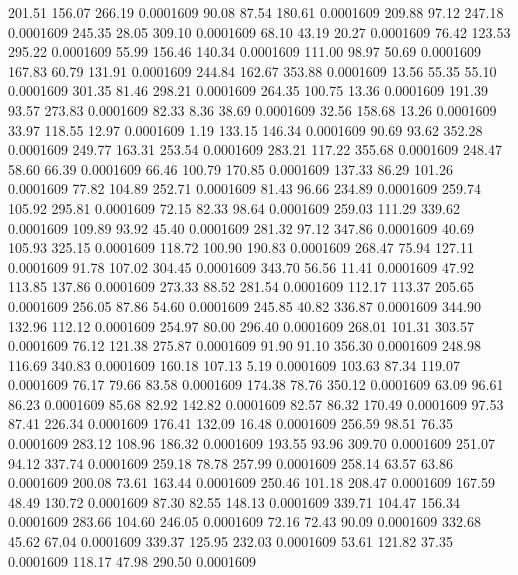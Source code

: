  201.51  156.07  266.19   0.0001609
  90.08   87.54  180.61   0.0001609
 209.88   97.12  247.18   0.0001609
 245.35   28.05  309.10   0.0001609
  68.10   43.19   20.27   0.0001609
  76.42  123.53  295.22   0.0001609
  55.99  156.46  140.34   0.0001609
 111.00   98.97   50.69   0.0001609
 167.83   60.79  131.91   0.0001609
 244.84  162.67  353.88   0.0001609
  13.56   55.35   55.10   0.0001609
 301.35   81.46  298.21   0.0001609
 264.35  100.75   13.36   0.0001609
 191.39   93.57  273.83   0.0001609
  82.33    8.36   38.69   0.0001609
  32.56  158.68   13.26   0.0001609
  33.97  118.55   12.97   0.0001609
   1.19  133.15  146.34   0.0001609
  90.69   93.62  352.28   0.0001609
 249.77  163.31  253.54   0.0001609
 283.21  117.22  355.68   0.0001609
 248.47   58.60   66.39   0.0001609
  66.46  100.79  170.85   0.0001609
 137.33   86.29  101.26   0.0001609
  77.82  104.89  252.71   0.0001609
  81.43   96.66  234.89   0.0001609
 259.74  105.92  295.81   0.0001609
  72.15   82.33   98.64   0.0001609
 259.03  111.29  339.62   0.0001609
 109.89   93.92   45.40   0.0001609
 281.32   97.12  347.86   0.0001609
  40.69  105.93  325.15   0.0001609
 118.72  100.90  190.83   0.0001609
 268.47   75.94  127.11   0.0001609
  91.78  107.02  304.45   0.0001609
 343.70   56.56   11.41   0.0001609
  47.92  113.85  137.86   0.0001609
 273.33   88.52  281.54   0.0001609
 112.17  113.37  205.65   0.0001609
 256.05   87.86   54.60   0.0001609
 245.85   40.82  336.87   0.0001609
 344.90  132.96  112.12   0.0001609
 254.97   80.00  296.40   0.0001609
 268.01  101.31  303.57   0.0001609
  76.12  121.38  275.87   0.0001609
  91.90   91.10  356.30   0.0001609
 248.98  116.69  340.83   0.0001609
 160.18  107.13    5.19   0.0001609
 103.63   87.34  119.07   0.0001609
  76.17   79.66   83.58   0.0001609
 174.38   78.76  350.12   0.0001609
  63.09   96.61   86.23   0.0001609
  85.68   82.92  142.82   0.0001609
  82.57   86.32  170.49   0.0001609
  97.53   87.41  226.34   0.0001609
 176.41  132.09   16.48   0.0001609
 256.59   98.51   76.35   0.0001609
 283.12  108.96  186.32   0.0001609
 193.55   93.96  309.70   0.0001609
 251.07   94.12  337.74   0.0001609
 259.18   78.78  257.99   0.0001609
 258.14   63.57   63.86   0.0001609
 200.08   73.61  163.44   0.0001609
 250.46  101.18  208.47   0.0001609
 167.59   48.49  130.72   0.0001609
  87.30   82.55  148.13   0.0001609
 339.71  104.47  156.34   0.0001609
 283.66  104.60  246.05   0.0001609
  72.16   72.43   90.09   0.0001609
 332.68   45.62   67.04   0.0001609
 339.37  125.95  232.03   0.0001609
  53.61  121.82   37.35   0.0001609
 118.17   47.98  290.50   0.0001609

